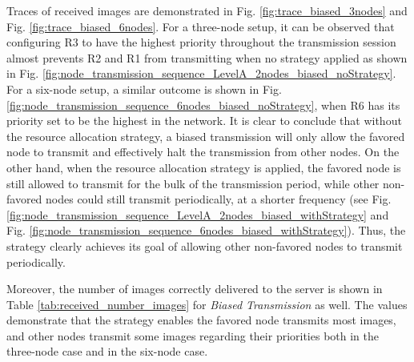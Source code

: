\documentclass[journal]{IEEEtran}  %
\begin{document}
Traces of received images are demonstrated in Fig.
\ref{fig:trace_biased_3nodes} and Fig. \ref{fig:trace_biased_6nodes}.
For a three-node setup, it can be observed that configuring R3 to have the
highest priority throughout the transmission session almost prevents R2 and R1
from transmitting when no strategy applied as shown in Fig.
\ref{fig:node_transmission_sequence_LevelA_2nodes_biased_noStrategy}.
For a six-node setup, a similar outcome is shown in Fig.
\ref{fig:node_transmission_sequence_6nodes_biased_noStrategy}, when R6
has its priority set to be the highest in the network. 
It is clear to conclude that without the resource allocation strategy, a biased
transmission will only allow the favored node to transmit and effectively halt
the transmission from other nodes.
On the other hand, when the resource allocation strategy is applied, the
favored node is still allowed to transmit for the bulk of the transmission
period, while other non-favored nodes could still transmit periodically,
  at a shorter frequency (see Fig.
\ref{fig:node_transmission_sequence_LevelA_2nodes_biased_withStrategy}
and Fig. \ref{fig:node_transmission_sequence_6nodes_biased_withStrategy}).
Thus, the strategy clearly achieves its goal of allowing other non-favored
nodes to transmit periodically.

Moreover, the number of images correctly delivered to the server is shown in
Table \ref{tab:received_number_images} for \textit{Biased Transmission} as
well. 
The values demonstrate that the strategy enables the favored node transmits
most images, and other nodes transmit some images regarding their priorities
both in the three-node case and in the six-node case. 
\end{document}
